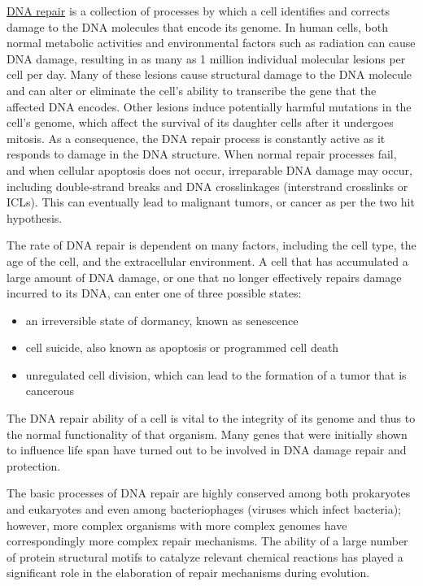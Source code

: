 \href{https://en.wikipedia.org/wiki/DNA_repair}{DNA repair} is a collection of processes by which a cell identifies and corrects damage to the DNA molecules that encode its genome. In human cells, both normal metabolic activities and environmental factors such as radiation can cause DNA damage, resulting in as many as 1 million individual molecular lesions per cell per day. Many of these lesions cause structural damage to the DNA molecule and can alter or eliminate the cell's ability to transcribe the gene that the affected DNA encodes. Other lesions induce potentially harmful mutations in the cell's genome, which affect the survival of its daughter cells after it undergoes mitosis. As a consequence, the DNA repair process is constantly active as it responds to damage in the DNA structure. When normal repair processes fail, and when cellular apoptosis does not occur, irreparable DNA damage may occur, including double-strand breaks and DNA crosslinkages (interstrand crosslinks or ICLs). This can eventually lead to malignant tumors, or cancer as per the two hit hypothesis.

The rate of DNA repair is dependent on many factors, including the cell type, the age of the cell, and the extracellular environment. A cell that has accumulated a large amount of DNA damage, or one that no longer effectively repairs damage incurred to its DNA, can enter one of three possible states:

\begin{itemize}
\tightlist
\item
  an irreversible state of dormancy, known as senescence
\item
  cell suicide, also known as apoptosis or programmed cell death
\item
  unregulated cell division, which can lead to the formation of a tumor that is cancerous
\end{itemize}

The DNA repair ability of a cell is vital to the integrity of its genome and thus to the normal functionality of that organism. Many genes that were initially shown to influence life span have turned out to be involved in DNA damage repair and protection.

The basic processes of DNA repair are highly conserved among both prokaryotes and eukaryotes and even among bacteriophages (viruses which infect bacteria); however, more complex organisms with more complex genomes have correspondingly more complex repair mechanisms. The ability of a large number of protein structural motifs to catalyze relevant chemical reactions has played a significant role in the elaboration of repair mechanisms during evolution.

